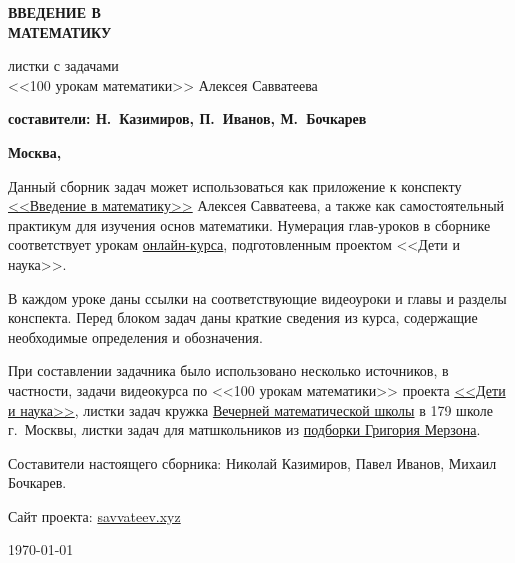 {\thispagestyle{empty}


\begin{flushright}
\quad

\vspace{2cm}

{\fontsize{100pt}{0pt}\bfseries\sffamily ВВЕДЕНИЕ В\\[20pt] МАТЕМАТИКУ}


\vspace{2cm}

{\fontsize{20pt}{22pt}\sffamily листки с задачами\\
<<100 урокам математики>> Алексея Савватеева\\[5pt]
}

\vspace{2cm}

{\Large\bfseries\sffamily составители: Н.~Казимиров, П.~Иванов, М.~Бочкарев}

\vfill

{\Large\bfseries\sffamily 	Москва, \number\year}
\end{flushright}
}




 


Данный сборник задач может использоваться как приложение к конспекту \href{https://github.com/nkrishelie/mathempire/raw/master/250/250le\%C3\%A7ons.pdf}{<<Введение в математику>>} Алексея Савватеева, а также как самостоятельный практикум для изучения основ математики. Нумерация глав-уроков в сборнике соответствует урокам \href{https://childrenscience.ru/courses/sav/}{онлайн-курса}, подготовленным проектом <<Дети и наука>>.

В каждом уроке даны ссылки на соответствующие видеоуроки и главы и разделы конспекта. Перед блоком задач даны краткие сведения из курса, содержащие необходимые определения и обозначения.

При составлении задачника было использовано несколько источников, в частности, задачи видеокурса по <<100 урокам математики>> проекта \href{http://childrenscience.ru/}{<<Дети и наука>>}, листки задач кружка \href{https://www.shashkovs.ru/vmsh/}{Вечерней математической школы} в 179 школе г.~Москвы, листки задач для матшкольников из \href{https://dev.mccme.ru/~merzon/listki.html}{подборки Григория Мерзона}.

Составители настоящего сборника: Николай Казимиров, Павел Иванов, Михаил Бочкарев.

Сайт проекта: \href{https://savvateev.xyz/100urokov}{savvateev.xyz}

\quad

\quad \hfill \today



